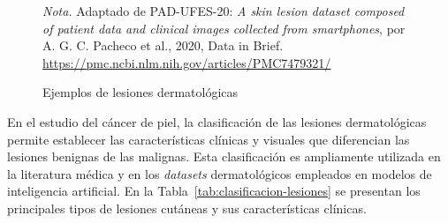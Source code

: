 \begin{figure}[!htbp]
\caption{Ejemplos de lesiones dermatológicas}
\label{fig:original-1}
\centering
    
    
\par\smallskip
\raggedright\footnotesize
\textit{Nota.} Adaptado de PAD-UFES-20: \emph{A skin lesion dataset composed of patient data and clinical images collected from smartphones}, por A. G. C. Pacheco et al., 2020, Data in Brief. \url{https://pmc.ncbi.nlm.nih.gov/articles/PMC7479321/}

\end{figure}

En el estudio del cáncer de piel, la clasificación de las lesiones dermatológicas permite establecer las características clínicas y visuales que diferencian las lesiones benignas de las malignas. Esta clasificación es ampliamente utilizada en la literatura médica y en los \textit{datasets} dermatológicos empleados en modelos de inteligencia artificial. En la Tabla~\ref{tab:clasificacion-lesiones} se presentan los principales tipos de lesiones cutáneas y sus características clínicas.

